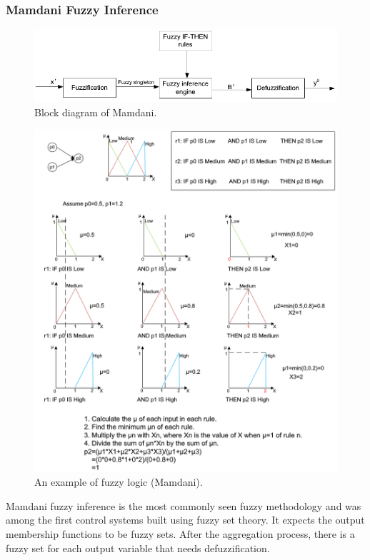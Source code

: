 \documentclass[journal,a4paper,onecolumn]{article}
\begin{document}
\subsubsection{Mamdani Fuzzy Inference}
\begin{figure}[!hbt]
	\begin{center}
		\includegraphics[width=\columnwidth]{fig48}
		\caption{Block diagram of Mamdani.}
		\label{fig:Block diagram of Mamdani}
	\end{center}
\end{figure}
\begin{figure}[!hbt]
	\begin{center}
		\includegraphics[width=\columnwidth]{fuzzy_logic_example}
		\caption{An example of fuzzy logic (Mamdani).}
		\label{fig:An example of fuzzy logic (Mamdani)}
	\end{center}
\end{figure}
Mamdani fuzzy inference is the most commonly seen fuzzy methodology and was among the first control systems built using fuzzy set theory. It expects the output membership functions to be fuzzy sets. After the aggregation process, there is a fuzzy set for each output variable that needs defuzzification. \cite{mamdani}
\end{document}
